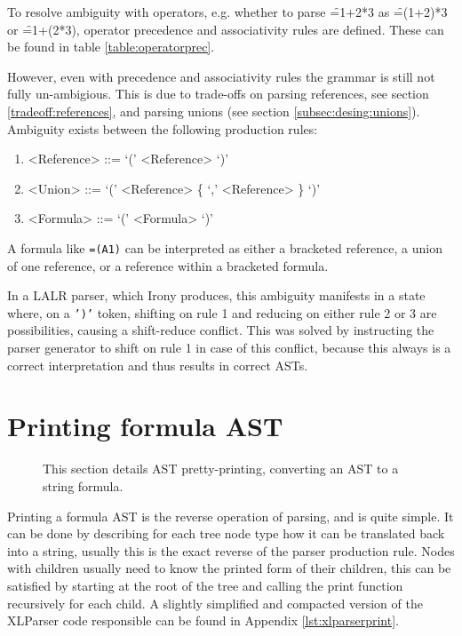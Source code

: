 To resolve ambiguity with operators, e.g. whether to parse \f{=1+2*3} as \f{=(1+2)*3} or \f{=1+(2*3)}, operator precedence and associativity rules are defined.
These can be found in table \ref{table:operatorprec}.

However, even with precedence and associativity rules the grammar is still not fully un-ambigious.
This is due to trade-offs on parsing references, see section \ref{tradeoff:references}, and parsing unions (see section \ref{subsec:desing:unions}).
Ambiguity exists between the following production rules:
\begin{enumerate}
	\item \begin{grammar}<Reference> ::= `(' <Reference> `)'\end{grammar}
	\item \begin{grammar}<Union> ::= `(' <Reference> \{ `,' <Reference> \} `)'\end{grammar}
	\item \begin{grammar}<Formula> ::= `(' <Formula> `)'\end{grammar}
\end{enumerate}

A formula like \texttt{=(A1)} can be interpreted as either a bracketed reference, a union of one reference, or a reference within a bracketed formula.

In a LALR parser, which Irony produces, this ambiguity manifests in a state where, on a \texttt{')'} token, shifting on rule 1 and reducing on either rule 2 or 3 are possibilities, causing a shift-reduce conflict.
This was solved by instructing the parser generator to shift on rule 1 in case of this conflict, because this always is a correct interpretation and thus results in correct ASTs.

\section{Printing formula AST}
\label{sec:printing}

\noindent
\begin{figure}[h!]
\hspace*{0.003\textwidth}

\caption{This section details AST pretty-printing, converting an AST to a string formula.}
\end{figure}

Printing a formula AST is the reverse operation of parsing, and is quite simple.
It can be done by describing for each tree node type how it can be translated back into a string, usually this is the exact reverse of the parser production rule.
Nodes with children usually need to know the printed form of their children, this can be satisfied by starting at the root of the tree and calling the print function recursively for each child.
A slightly simplified and compacted version of the XLParser code responsible can be found in Appendix \ref{lst:xlparserprint}.

